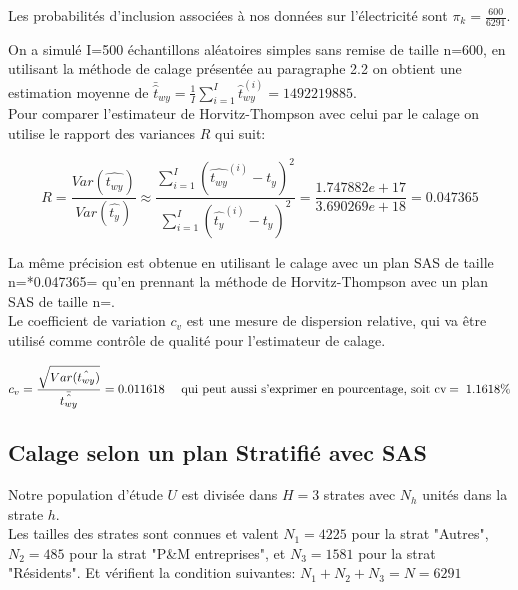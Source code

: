 \documentclass[11pt,fleqn]{book} %
\begin{document}
\begin{remark}
Les probabilités d'inclusion associées à nos données sur l'électricité sont $\pi_k=\frac{600}{6291}$.
\end{remark}



\newpage

On a simulé I=500 échantillons aléatoires simples sans remise de taille n=600, en utilisant la méthode de calage présentée au paragraphe 2.2 on obtient une estimation moyenne de $\bar{\hat{t}}_{wy}=\frac{1}{I}\sum_{i=1}^I \hat{t}_{wy}^{(i)}=1492219885$.\\

Pour comparer l'estimateur de Horvitz-Thompson avec celui par le calage on utilise le rapport des variances $R$ qui suit:

\begin{equation*}
R=\frac{Var(\hat{t_{wy}})}{Var(\hat{t_y})}\approx\frac{\sum_{i=1}^{I} (\hat{t_{wy}}^{(i)}-t_y)^2}{\sum_{i=1}^{I} (\hat{t_y}^{(i)}-t_y)^2}=\frac{1.747882e+17}{3.690269e+18}= 0.047365
\end{equation*}
 
La même précision est obtenue en utilisant le calage avec un plan SAS de taille n\:=*0.047365\:= qu'en prennant la méthode de Horvitz-Thompson avec un plan SAS de taille n\:=.\\


Le coefficient de variation $c_v$ est une mesure de dispersion relative, qui va être utilisé comme contrôle de qualité pour l'estimateur de calage.

\begin{equation*}
 c_v=\frac{\sqrt{Var(\hat{t_{wy}})}}{\bar{\hat{t_{wy}}}} = 0.011618 \quad \textnormal{ qui peut aussi s'exprimer en pourcentage, soit cv\:=\: 1.1618\%}
 \end{equation*}
 
 
 
 \subsection{Calage selon un plan Stratifié avec SAS}
 
 
 
\vspace{1em}

 Notre population d'étude $U$ est divisée dans $H=3$ strates avec $N_h$ unités dans la strate $h$.\\ 
 Les tailles des strates sont connues et valent $N_1=4225$ pour la strat "Autres", $N_2= 485$ pour la strat "P\&M entreprises", et $N_3=1581$ pour la strat "Résidents". Et vérifient la condition suivantes: $N_1+N_2+N_3=N=6291$
 
\end{document}
